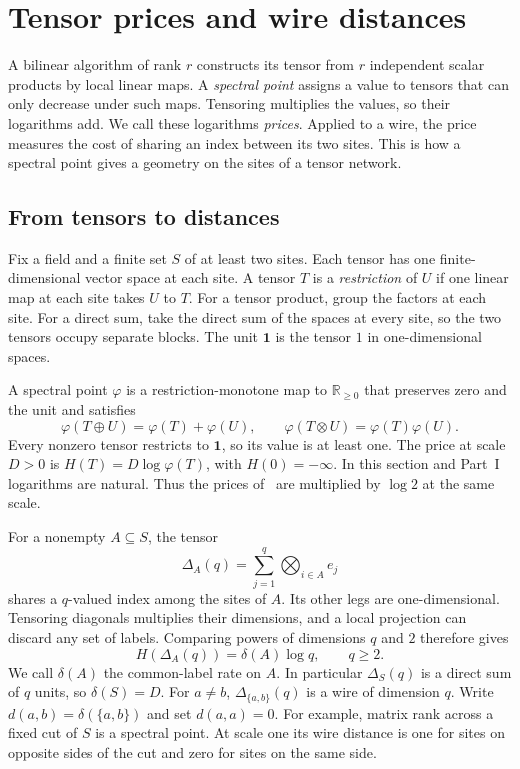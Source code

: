 \section{Tensor prices and wire distances}\label{sec:prices-background}
A bilinear algorithm of rank \(r\) constructs its tensor from \(r\)
independent scalar products by local linear maps. A \emph{spectral
point} assigns a value to tensors that can only decrease under such
maps. Tensoring multiplies the values, so their logarithms add. We call
these logarithms \emph{prices}. Applied to a wire, the price measures
the cost of sharing an index between its two sites. This is how a
spectral point gives a geometry on the sites of a tensor network.

\subsection{From tensors to distances}
Fix a field and a finite set \(S\) of at least two sites. Each tensor
has one finite-dimensional vector space at each site. A tensor \(T\)
is a \emph{restriction} of \(U\) if one linear map at each site takes
\(U\) to \(T\). For a tensor product, group the factors at each site.
For a direct sum, take the direct sum of the spaces at every site, so
the two tensors occupy separate blocks. The unit \(\mathbf 1\) is the
tensor \(1\) in one-dimensional spaces.

A spectral point \(\varphi\) is a restriction-monotone map to
\(\mathbb R_{\ge0}\) that preserves zero and the unit and satisfies
\[
     \varphi(T\oplus U)=\varphi(T)+\varphi(U),\qquad
     \varphi(T\otimes U)=\varphi(T)\varphi(U).
\]
Every nonzero tensor restricts to \(\mathbf 1\), so its value is at least
one. The price at scale \(D>0\) is \(H(T)=D\log\varphi(T)\), with
\(H(0)=-\infty\). In this section and Part~I logarithms are natural.
Thus the prices of~\cite{oaG} are multiplied by \(\log 2\) at the same scale.

For a nonempty \(A\subseteq S\), the tensor
\[
         \Delta_A(q)=\sum_{j=1}^q\bigotimes_{i\in A} e_j
\]
shares a \(q\)-valued index among the sites of \(A\). Its other legs are
one-dimensional. Tensoring diagonals multiplies their dimensions, and a
local projection can discard any set of labels. Comparing powers of
dimensions \(q\) and \(2\) therefore gives
\[
            H(\Delta_A(q))=\delta(A)\log q,\qquad q\ge2.
\]
We call \(\delta(A)\) the common-label rate on \(A\). In particular
\(\Delta_S(q)\) is a direct sum of \(q\) units, so \(\delta(S)=D\).
For \(a\ne b\), \(\Delta_{\{a,b\}}(q)\) is a wire of dimension \(q\).
Write \(d(a,b)=\delta(\{a,b\})\) and set \(d(a,a)=0\).
For example, matrix rank across a fixed cut of \(S\) is a spectral
point. At scale one its wire distance is one for sites on opposite
sides of the cut and zero for sites on the same side.

